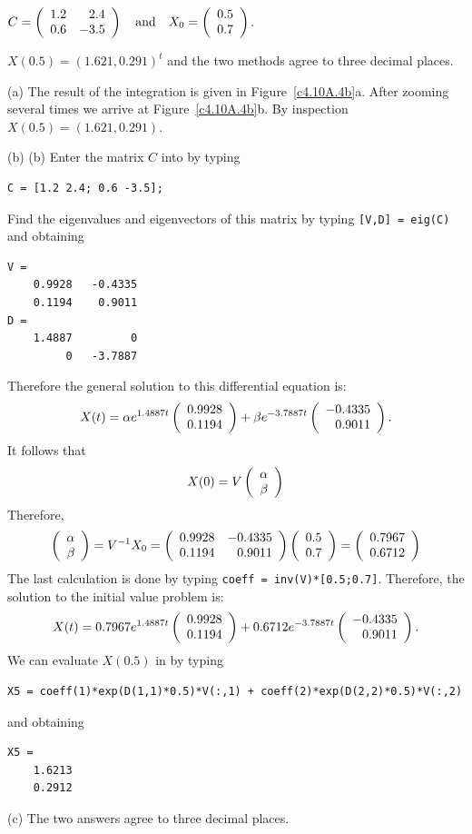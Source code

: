 \documentclass{ximera}
\begin{document}
\begin{computerExercise}  \label{c4.10A.4b}  
$C = \left(\begin{array}{rr} 1.2 & 2.4\\ 0.6 &-3.5\end{array}\right) \quad\mbox{and}\quad X_0=\left(\begin{array}{r} 0.5 \\ 0.7\end{array}\right)$.

\begin{solution}
\ans $X(0.5) = (1.621,0.291)^t$ and the two methods agree to three 
decimal places.

\soln (a) The result of the {\pplane} integration is given in 
Figure~\ref{c4.10A.4b}a. After zooming several times we arrive at
Figure~\ref{c4.10A.4b}b.  By inspection $X(0.5)=(1.621,0.291)$.

(b) (b)  Enter the matrix $C$ into \Matlab by typing
\begin{verbatim}
C = [1.2 2.4; 0.6 -3.5];
\end{verbatim}
Find the eigenvalues and eigenvectors of this matrix by typing {\tt [V,D] = eig(C)}
and obtaining
\begin{verbatim}
V =
    0.9928   -0.4335
    0.1194    0.9011
D =
    1.4887         0
         0   -3.7887
\end{verbatim}
Therefore the general solution to this differential equation is:
\[
X(t) = \alpha e^{1.4887 t}\left(\begin{array}{r} 0.9928 \\ 0.1194\end{array}\right) +
\beta e^{-3.7887 t}\left(\begin{array}{r} -0.4335 \\ 0.9011\end{array}\right).
\]
It follows that 
\[
X(0) = V \left(\begin{array}{r} \alpha \\ \beta\end{array}\right)
\]
Therefore,
\[
\left(\begin{array}{r} \alpha \\ \beta\end{array}\right) = V^{-1} X_0 = 
\left(\begin{array}{rr} 0.9928 & -0.4335\\ 0.1194 &0.9011\end{array}\right)\left(\begin{array}{r} 0.5 \\ 0.7\end{array}\right) = \left(\begin{array}{r} 0.7967 \\ 0.6712\end{array}\right)
\]
The last calculation is done by typing {\tt coeff = inv(V)*[0.5;0.7]}. 
Therefore, the solution to the initial value problem is:
\[
X(t) = 0.7967e^{1.4887 t}\left(\begin{array}{r} 0.9928 \\ 0.1194\end{array}\right) +
0.6712e^{-3.7887 t}\left(\begin{array}{r} -0.4335 \\ 0.9011\end{array}\right).
\]
We can evaluate $X(0.5)$ in \Matlab by typing
\begin{verbatim}
X5 = coeff(1)*exp(D(1,1)*0.5)*V(:,1) + coeff(2)*exp(D(2,2)*0.5)*V(:,2)
\end{verbatim}
and obtaining
\begin{verbatim}
X5 =
    1.6213
    0.2912
\end{verbatim}

(c)  The two answers agree to three decimal places.



\end{solution}
\end{computerExercise}
\end{document}
